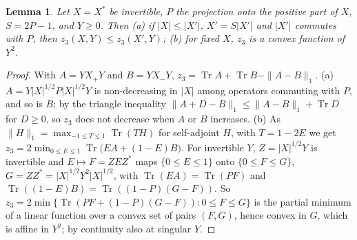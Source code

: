 \documentclass[11pt]{article}
\DeclareMathOperator{\Tr}{Tr}
\theoremstyle{plain}
\newtheorem{lemma}[theorem]{Lemma}
\theoremstyle{definition}
\theoremstyle{remark}
\begin{document}
\begin{lemma}\label{lem:exp3}
Let $X=X^*$ be invertible, $P$ the projection onto the positive part of $X$, $S=2P-1$, and $Y\ge0$. Then
(a) if $|X|\le|X'|$, $X'=S|X'|$ and $|X'|$ commutes with $P$, then $z_3(X,Y)\le z_3(X',Y)$; (b) for fixed $X$, $z_3$ is a
convex function of $Y^2$.
\end{lemma}
\begin{proof}
With $A=YX_+Y$ and $B=YX_-Y$, $z_3=\Tr A+\Tr B-\|A-B\|_1$. (a) $A=Y|X|^{1/2}P|X|^{1/2}Y$ is non-decreasing in $|X|$ among
operators commuting with $P$, and so is $B$; by the triangle inequality $\|A+D-B\|_1\le\|A-B\|_1+\Tr D$ for $D\ge0$, so
$z_3$ does not decrease when $A$ or $B$ increases. (b) As $\|H\|_1=\max_{-1\le T\le1}\Tr(TH)$ for self-adjoint $H$, with
$T=1-2E$ we get $z_3=2\min_{0\le E\le1}\Tr\bigl(EA+(1-E)B\bigr)$. For invertible $Y$, $Z=|X|^{1/2}Y$ is invertible and
$E\mapsto F=ZEZ^*$ maps $\{0\le E\le1\}$ onto $\{0\le F\le G\}$, $G=ZZ^*=|X|^{1/2}Y^2|X|^{1/2}$, with $\Tr(EA)=\Tr(PF)$ and
$\Tr((1-E)B)=\Tr((1-P)(G-F))$. So $z_3=2\min\{\Tr(PF+(1-P)(G-F)):0\le F\le G\}$ is the partial minimum of a linear
function over a convex set of pairs $(F,G)$, hence convex in $G$, which is affine in $Y^2$; by continuity also at
singular $Y$.
\end{proof}
\end{document}
